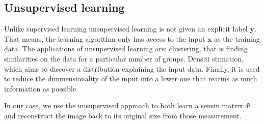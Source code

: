 \subsection{Unsupervised learning} \label{sec:unsuperv}
Unlike supervised learning unsupervised learning is not given an explicit label $\mathbf{y}$. That means, the learning algorithm only has access to the input  $\mathbf{x}$ as the training data. The applications of unsupervised learning are: clustering, that is finding similarities on the data for a particular number of groups. Densiti stimation, which aims to discover a distribution explaining the input data. Finally, it is used to reduce the dimmensionality of the input into a lower one that reatins as much information as possible. \

In our case, we use the unsupervised approach to both learn a sensin matrix $\Phi$ and  reconstruct the image back to its original size from those measurement. 
        

